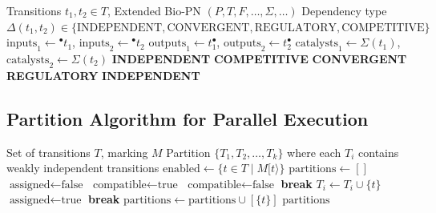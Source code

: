 \begin{algorithm}[htbp]
\caption{Classify Dependency Type}
\label{alg:classify-dependency}
\begin{algorithmic}[1]
\Require Transitions $t_1, t_2 \in T$, Extended Bio-PN $(P, T, F, \ldots, \Sigma, \ldots)$
\Ensure Dependency type $\Delta(t_1, t_2) \in \{\text{INDEPENDENT}, \text{CONVERGENT}, \text{REGULATORY}, \text{COMPETITIVE}\}$
\State $\text{inputs}_1 \gets {}^\bullet t_1$, $\text{inputs}_2 \gets {}^\bullet t_2$
\State $\text{outputs}_1 \gets t_1^\bullet$, $\text{outputs}_2 \gets t_2^\bullet$
\State $\text{catalysts}_1 \gets \Sigma(t_1)$, $\text{catalysts}_2 \gets \Sigma(t_2)$
    \State \Return \textbf{INDEPENDENT} 
    \State \Return \textbf{COMPETITIVE} 
    \State \Return \textbf{CONVERGENT} 
    \State \Return \textbf{REGULATORY} 
\Else
    \State \Return \textbf{INDEPENDENT} 
\EndIf
\end{algorithmic}
\end{algorithm}

\subsection{Partition Algorithm for Parallel Execution}
\label{subsec:partition-algorithm}

\begin{algorithm}[htbp]
\caption{Partition Transitions for Parallel Execution}
\label{alg:partition-transitions}
\begin{algorithmic}[1]
\Require Set of transitions $T$, marking $M$
\Ensure Partition $\{T_1, T_2, \ldots, T_k\}$ where each $T_i$ contains weakly independent transitions
\State $\text{enabled} \gets \{t \in T \mid M[t\rangle\}$ 
\State $\text{partitions} \gets []$
    \State $\text{assigned} \gets \text{false}$
        \State $\text{compatible} \gets \text{true}$
             
                \State $\text{compatible} \gets \text{false}$
                \State \textbf{break}
            \EndIf
        \EndFor
            \State $T_i \gets T_i \cup \{t\}$
            \State $\text{assigned} \gets \text{true}$
            \State \textbf{break}
        \EndIf
    \EndFor
        \State $\text{partitions} \gets \text{partitions} \cup [\{t\}]$ 
    \EndIf
\EndFor
\State \Return $\text{partitions}$
\end{algorithmic}
\end{algorithm}

